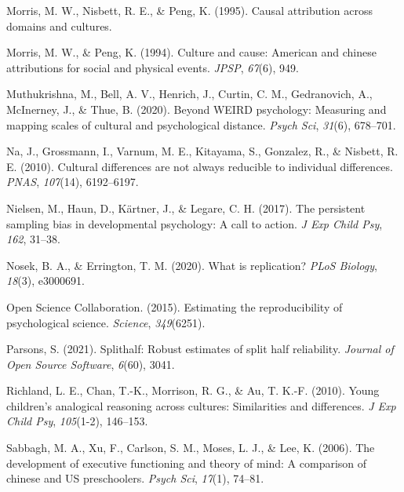 \documentclass[
  man]{apa6}
\newlength{\cslhangindent}
\newlength{\cslentryspacingunit} %
\newenvironment{CSLReferences}[2] %
 {%
  \setlength{\parindent}{0pt}
  \ifodd #1
  \let\oldpar\par
  \def\par{\hangindent=\cslhangindent\oldpar}
  \fi
  \setlength{\parskip}{#2\cslentryspacingunit}
 }%
 {}
\begin{document}
\begin{CSLReferences}{1}{0}
\leavevmode{}%
Morris, M. W., Nisbett, R. E., \& Peng, K. (1995). Causal attribution across domains and cultures.

\leavevmode{}%
Morris, M. W., \& Peng, K. (1994). Culture and cause: American and chinese attributions for social and physical events. \emph{JPSP}, \emph{67}(6), 949.

\leavevmode{}%
Muthukrishna, M., Bell, A. V., Henrich, J., Curtin, C. M., Gedranovich, A., McInerney, J., \& Thue, B. (2020). Beyond WEIRD psychology: Measuring and mapping scales of cultural and psychological distance. \emph{Psych Sci}, \emph{31}(6), 678--701.

\leavevmode{}%
Na, J., Grossmann, I., Varnum, M. E., Kitayama, S., Gonzalez, R., \& Nisbett, R. E. (2010). Cultural differences are not always reducible to individual differences. \emph{PNAS}, \emph{107}(14), 6192--6197.

\leavevmode{}%
Nielsen, M., Haun, D., Kärtner, J., \& Legare, C. H. (2017). The persistent sampling bias in developmental psychology: A call to action. \emph{J Exp Child Psy}, \emph{162}, 31--38.

\leavevmode{}%
Nosek, B. A., \& Errington, T. M. (2020). What is replication? \emph{PLoS Biology}, \emph{18}(3), e3000691.

\leavevmode{}%
Open Science Collaboration. (2015). Estimating the reproducibility of psychological science. \emph{Science}, \emph{349}(6251).

\leavevmode{}%
Parsons, S. (2021). Splithalf: Robust estimates of split half reliability. \emph{Journal of Open Source Software}, \emph{6}(60), 3041.

\leavevmode{}%
Richland, L. E., Chan, T.-K., Morrison, R. G., \& Au, T. K.-F. (2010). Young children's analogical reasoning across cultures: Similarities and differences. \emph{J Exp Child Psy}, \emph{105}(1-2), 146--153.

\leavevmode{}%
Sabbagh, M. A., Xu, F., Carlson, S. M., Moses, L. J., \& Lee, K. (2006). The development of executive functioning and theory of mind: A comparison of chinese and US preschoolers. \emph{Psych Sci}, \emph{17}(1), 74--81.


\end{CSLReferences}
\end{document}
